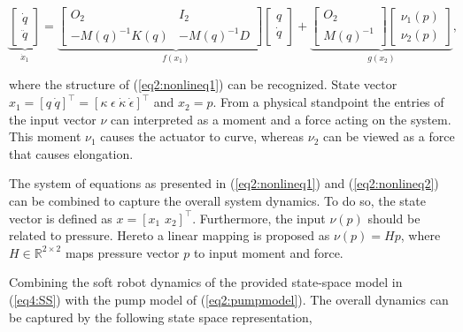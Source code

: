 \begin{equation}
    \underbrace{\begin{bmatrix}\dot{q}\\ \ddot{q}  \end{bmatrix}}_{\dot{x}_1}   = \underbrace{  \begin{bmatrix} O_{2} & I_{2} \\ -M(q)^{-1}K(q)  & -M(q)^{-1} D \end{bmatrix}   \begin{bmatrix} q \\ \dot{q} \end{bmatrix} }_{f(x_1)}  +      \underbrace{ \begin{bmatrix} O_{2} \\ M(q)^{-1}   \end{bmatrix}       \begin{bmatrix} \nu_1(p) \\ \nu_2(p)  
    \end{bmatrix} }_{g(x_2)}, 
    \label{eq4:SS}
\end{equation}

where the structure of (\ref{eq2:nonlineq1}) can be recognized. State vector $x_1 = [ q \hspace{3pt} \dot{q}   ]^\top =  [\kappa \hspace{3pt} \epsilon \hspace{3pt} \dot{\kappa}  \hspace{3pt} \dot{\epsilon}  ]^{\top}$ and $x_2 = p$. From a physical standpoint the entries of the input vector $\nu$ can interpreted as a moment and a force acting on the system. This moment $\nu_1$ causes the actuator to curve, whereas $\nu_2$ can be viewed as a force that causes elongation.


The system of equations as presented in (\ref{eq2:nonlineq1}) and (\ref{eq2:nonlineq2}) can be combined to capture the overall system dynamics. To do so, the state vector is defined as $x = [x_1 \hspace{4pt} x_2]^\top$. Furthermore, the input $\nu(p)$ should be related to pressure. Hereto a linear mapping is proposed as $\nu(p) = H p$, where $H \in \mathbb{R}^{2\times 2}$ maps pressure vector $p$ to input moment and force. 

Combining the soft robot dynamics of the provided state-space model in (\ref{eq4:SS}) with the pump model of (\ref{eq2:pumpmodel}). The overall dynamics can be captured by the following state space representation,

